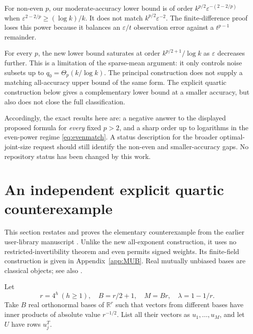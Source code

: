 \documentclass[11pt,letterpaper]{article}
\theoremstyle{definition}
\theoremstyle{remark}
\numberwithin{equation}{section}
\newcommand{\R}{\mathbb R}
\newcommand{\eps}{\varepsilon}
\begin{document}
For non-even $p$, our moderate-accuracy lower bound is of order
$k^{p/2}\eps^{-(2-2/p)}$ when $\eps^{2-2/p}\ge(\log k)/k$. It does not match $k^{p/2}\eps^{-2}$. The finite-difference proof loses this power because it balances an $\eps/t$ observation error against a $t^{p-1}$ remainder.

For every $p$, the new lower bound saturates at order $k^{p/2+1}/\log k$ as $\eps$ decreases further. This is a limitation of the sparse-mean argument: it only controls noise subsets up to $q_0=\Theta_p(k/\log k)$. The principal construction does not supply a matching all-accuracy upper bound of the same form. The explicit quartic construction below gives a complementary lower bound at a smaller accuracy, but also does not close the full classification.

Accordingly, the exact results here are: a negative answer to the displayed proposed formula for \emph{every} fixed $p>2$, and a sharp order up to logarithms in the even-power regime \eqref{eq:evenmatch}. A status description for the broader optimal-joint-size request should still identify the non-even and smaller-accuracy gaps. No repository status has been changed by this work.

\section{An independent explicit quartic counterexample}\label{sec:quartic}
This section restates and proves the elementary counterexample from the earlier user-library manuscript \cite{prior}. Unlike the new all-exponent construction, it uses no restricted-invertibility theorem and even permits signed weights. Its finite-field construction is given in Appendix~\ref{app:MUB}. Real mutually unbiased bases are classical objects; see also \cite{Boykin}.

Let
\begin{equation}\label{eq:MUBcounts}
 r=4^h\ (h\ge1),\quad B=r/2+1,\quad M=Br,\quad\lambda=1-1/r.
\end{equation}
Take $B$ real orthonormal bases of $\R^r$ such that vectors from different bases have inner products of absolute value $r^{-1/2}$. List all their vectors as $u_1,\ldots,u_M$, and let $U$ have rows $u_j^T$.
\end{document}
